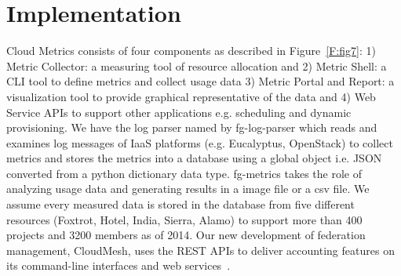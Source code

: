 \documentclass{sig-alternate}
\begin{document}
\section{Implementation} \label{S:implementation}




Cloud Metrics consists of four components as described in Figure~\ref{F:fig7}: 1) Metric Collector: a measuring tool of resource allocation and 2) Metric Shell: a CLI tool to define metrics and collect usage data 3) Metric Portal and Report: a visualization tool to provide graphical representative of the data and 4) Web Service APIs to support other applications e.g. scheduling and dynamic provisioning. We have the log parser named by fg-log-parser which reads and examines log messages of IaaS platforms (e.g. Eucalyptus, OpenStack) to collect metrics and stores the metrics into a database using a global object i.e. JSON converted from a python dictionary data type. fg-metrics takes the role of analyzing usage data and generating results in a image file or a csv file. We assume every measured data is stored in the database from five different resources (Foxtrot, Hotel, India, Sierra, Alamo) to support more than 400 projects and 3200 members as of 2014. Our new development of federation management, CloudMesh, uses the REST APIs to deliver accounting features on its command-line interfaces and web services~\cite{las14cloudmeshmultiple}.
\end{document}
